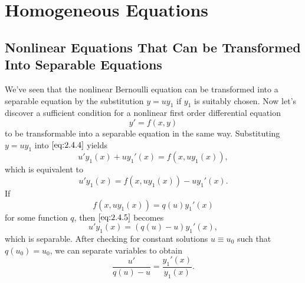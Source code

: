 \documentclass{ximera}
\begin{document}





\section*{Homogeneous Equations}
\subsection*{Nonlinear Equations That Can be  Transformed Into Separable Equations}

We've seen that the nonlinear Bernoulli equation can be transformed
into a separable equation by  the substitution $y=uy_1$ if
$y_1$ is suitably chosen. Now let's discover a sufficient condition
for a nonlinear first order differential equation
\begin{equation} \label{eq:2.4.4}
y'=f(x,y)
\end{equation}
to be transformable into a separable equation in the same way.
  Substituting $y=uy_1$  into
$\eqref{eq:2.4.4}$ yields
$$
u'y_1(x)+uy_1'(x)=f(x,uy_1(x)),
$$
which is equivalent to
\begin{equation} \label{eq:2.4.5}
u'y_1(x)=f(x,uy_1(x))-uy_1'(x).
\end{equation}
If
$$
f(x,uy_1(x))=q(u)y_1'(x)
$$
for some function $q$, then   $\eqref{eq:2.4.5}$ becomes
\begin{equation} \label{eq:2.4.6}
u'y_1(x)=(q(u)-u)y_1'(x),
\end{equation}
which is separable. After checking for constant solutions $u\equiv
u_0$ such that $q(u_0)=u_0$, we can separate
variables to obtain
$$
\frac{u'}{q(u)-u}=\frac{y_1'(x)}{y_1(x)}.
$$
\end{document}
